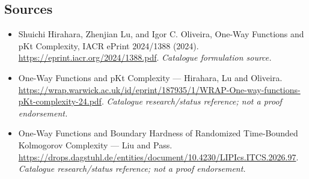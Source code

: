 \documentclass[11pt,a4paper]{article}
\begin{document}
\subsection{Sources}
\begin{itemize}\raggedright
\item[\textnormal{[S1]}]\hypertarget{source:3403:1}{} Shuichi Hirahara, Zhenjian Lu, and Igor C. Oliveira, One-Way Functions and pKt Complexity, IACR ePrint 2024/1388 (2024).
\url{https://eprint.iacr.org/2024/1388.pdf}.
{\small\textit{Catalogue formulation source.}}
\item[\textnormal{[S2]}]\hypertarget{source:3403:2}{} One-Way Functions and pKt Complexity — Hirahara, Lu and Oliveira.
\url{https://wrap.warwick.ac.uk/id/eprint/187935/1/WRAP-One-way-functions-pKt-complexity-24.pdf}.
{\small\textit{Catalogue research/status reference; not a proof endorsement.}}
\item[\textnormal{[S3]}]\hypertarget{source:3403:3}{} One-Way Functions and Boundary Hardness of Randomized Time-Bounded Kolmogorov Complexity — Liu and Pass.
\url{https://drops.dagstuhl.de/entities/document/10.4230/LIPIcs.ITCS.2026.97}.
{\small\textit{Catalogue research/status reference; not a proof endorsement.}}
\end{itemize}

\end{document}
